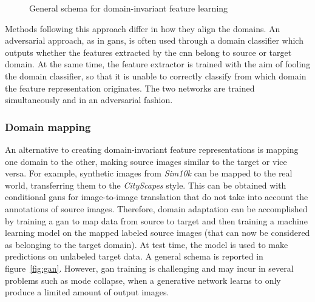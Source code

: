 \documentclass[%
    corpo=12pt,
    twoside,
    stile=classica,   
    tipotesi=magistrale,
    evenboxes,
    english,
	numerazioneromana,
]{toptesi}
\begin{document}
\begin{figure}[ht]
	\centering
	\caption{General schema for domain-invariant feature learning\cite{wilson2020survey}}
	\label{fig:align}
\end{figure}

Methods following this approach differ in how they align the domains. An adversarial approach, as in \glspl{gan}, is often used through a domain classifier which outputs whether the features extracted by the \gls{cnn} belong to source or target domain. At the same time, the feature extractor is trained with the aim of fooling the domain classifier, so that it is unable to correctly classify from which domain the feature representation originates. The two networks are trained simultaneously and in an adversarial fashion.

\subsubsection{Domain mapping}
An alternative to creating domain-invariant feature representations is mapping one domain to the other, making source images similar to the target or vice versa. For example, synthetic images from \textit{Sim10k} can be mapped to the real world, transferring them to the \textit{CityScapes} style. This can be obtained with conditional \glspl{gan} for image-to-image translation that do not take into account the annotations of source images. Therefore, domain adaptation can be accomplished by training a \gls{gan} to map data from source to target and then training a machine learning model on the mapped labeled source images (that can now be considered as belonging to the target domain). At test time, the model is used to make predictions on unlabeled target data. A general schema is reported in figure~\ref{fig:gan}. However, \gls{gan} training is challenging and may incur in several problems such as mode collapse, when a generative network learns to only produce a limited amount of output images.
\end{document}
